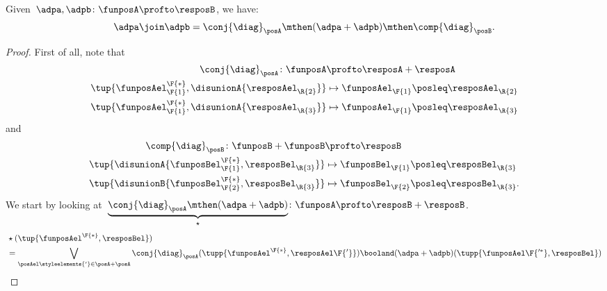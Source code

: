 \begin{lemma}
    Given~$\adpa, \adpb\colon \funposA \profto \resposB$, we have:
    \begin{equation}
        \adpa \join \adpb =  \conj{\diag}_\posA \mthen (\adpa + \adpb)\mthen \comp{\diag}_\posB.
    \end{equation}
\end{lemma}
\begin{proof}
    First of all, note that
    \begin{equation}
        \begin{aligned}
            \conj{\diag}_\posA\colon \funposA                         & \profto \resposA+\resposA                        \\
            \tup{\funposAel_\F{1}^\F{*},\disunionA{\resposAel_\R{2}}} & \mapsto \funposAel_\F{1}\posleq \resposAel_\R{2} \\
            \tup{\funposAel_\F{1}^\F{*},\disunionA{\resposAel_\R{3}}} & \mapsto \funposAel_\F{1}\posleq \resposAel_\R{3}
        \end{aligned}
    \end{equation}
    and
    \begin{equation}
        \begin{aligned}
            \comp{\diag}_\posB\colon \funposB+\funposB                & \profto \resposB                                   \\
            \tup{\disunionA{\funposBel_\F{1}^\F{*},\resposBel_\R{3}}} & \mapsto \funposBel_\F{1}\posleq \resposBel_\R{3}   \\
            \tup{\disunionB{\funposBel_\F{2}^\F{*},\resposBel_\R{3}}} & \mapsto \funposBel_\F{2} \posleq \resposBel_\R{3}.
        \end{aligned}
    \end{equation}
    We start by looking at~$\underbrace{\conj{\diag}_\posA\mthen (\adpa+\adpb)}_{\star}\colon \funposA \profto \resposB+\resposB$.
    \begin{equation}
        \begin{aligned}
            &
            \star (\tup{\funposAel^\F{*},\resposBel}) \\& =\bigvee_{\posAel\styleelements{'}\in \posA+\posA} \conj{\diag}_\posA(\tupp{\funposAel^\F{*},\resposAel\F{'}})\booland (\adpa+\adpb)(\tupp{\funposAel\F{'^*},\resposBel})                                                                                                                                                         \\

\end{aligned}
\end{equation}
\end{proof}
